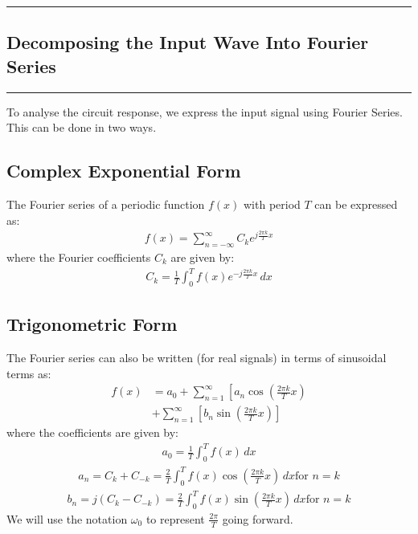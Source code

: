 \newpage
\begin{multicols}{2}
\tableofcontents
\end{multicols}
\newpage

{\color{gray}\hrule}
\begin{center}
\section{Decomposing the Input Wave Into Fourier Series}
\bigskip
\end{center}
{\color{gray}\hrule}
\begin{multicols}{2}

To analyse the circuit response, we express the input signal using Fourier Series. This can be done in two ways.

\subsection{Complex Exponential Form}
The Fourier series of a periodic function \( f(x) \) with period \( T \) can be expressed as:
\begin{align}
f(x) = \sum_{n=-\infty}^{\infty} C_k e^{j \frac{2\pi k}{T} x}  
\end{align}
where the Fourier coefficients \( C_k \) are given by:
\begin{align}
C_k = \frac{1}{T} \int_{0}^{T} f(x) e^{-j \frac{2\pi k}{T} x} \, dx \label{1}
\end{align}

\subsection{Trigonometric Form}
The Fourier series can also be written (for real signals) in terms of sinusoidal terms as:
\begin{equation}
\begin{split}
f(x) &= a_0 + \sum_{n=1}^{\infty} \left[ a_n \cos\left(\frac{2\pi k}{T} x \right) \right. \\
&+ \sum_{n=1}^{\infty} \left[ b_n \sin\left(\frac{2\pi k}{T} x \right) \right]
\end{split}
\end{equation}
where the coefficients are given by:
\begin{align}
a_0 = \frac{1}{T} \int_{0}^{T} f(x) \, dx \label{2}
\end{align}
\begin{align}
	a_n =C_k+C_{-k} = \frac{2}{T} \int_{0}^{T} f(x) \cos\left(\frac{2\pi k}{T} x \right) \, dx \label{3} \text{for $n=k$}
\end{align}
\begin{align}
	b_n = j(C_k-C_{-k}) =\frac{2}{T} \int_{0}^{T} f(x) \sin\left(\frac{2\pi k}{T} x \right) \, dx \label{4} \text{for $n=k$}
\end{align}
We will use the notation $\omega_0$ to represent $\frac{2\pi}{T}$ going forward.


\end{multicols}
